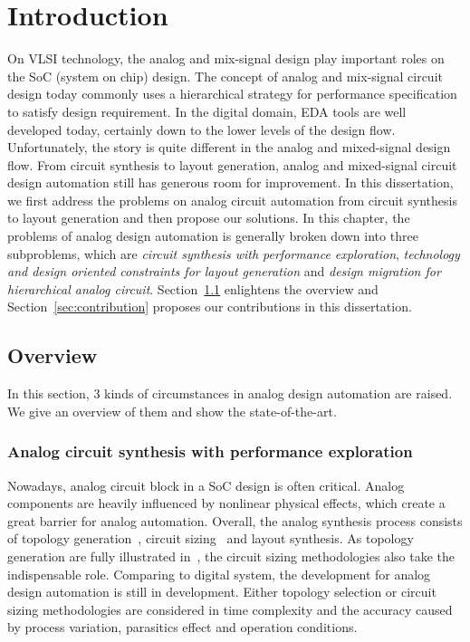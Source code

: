\chapter{Introduction}\label{chap:Intro}

  On VLSI technology, the analog and mix-signal design play important roles on the SoC (system on chip) design. The concept of analog and mix-signal circuit design today commonly uses a hierarchical strategy for performance specification~\cite{CADonAMSIC_GG-ProcIEEE2000} to satisfy design requirement. In the digital domain, EDA tools are well developed today, certainly down to the lower levels of the design flow. Unfortunately, the story is quite different in the analog and mixed-signal design flow. From circuit synthesis to layout generation, analog and mixed-signal circuit design automation still has generous room for improvement. In this dissertation, we first address the problems on analog circuit automation from circuit synthesis to layout generation and then propose our solutions. In this chapter, the problems of analog design automation is generally broken down into three subproblems, which are {\it circuit synthesis with performance exploration}, {\it technology and design oriented constraints for layout generation} and {\it design migration for hierarchical analog circuit}. Section~\ref{sec:overview} enlightens the overview and Section~\ref{sec:contribution} proposes our contributions in this dissertation. 

  \section{Overview}\label{sec:overview}

    In this section, 3 kinds of circumstances in analog design automation are raised. We give an overview of them and show the state-of-the-art. 

    \subsection{Analog circuit synthesis with performance exploration}\label{subsec:PAGEOverview}

      Nowadays, analog circuit block in a SoC design is often critical. Analog components are heavily influenced by nonlinear physical effects, which create a great barrier for analog automation. Overall, the analog synthesis process consists of topology generation~\cite{TopoSel_ICCAD2008,IPTopoSel_TCAD1995,CAFFEINE_DATE2005}, circuit sizing~\cite{MARS_TCAD2012} and layout synthesis. As topology generation are fully illustrated in~\cite{TopoSel_ICCAD2008,IPTopoSel_TCAD1995,CAFFEINE_DATE2005}, the circuit sizing methodologies also take the indispensable role. Comparing to digital system, the development for analog design automation is still in development. Either topology selection or circuit sizing methodologies are considered in time complexity and the accuracy caused by process variation, parasitics effect and operation conditions.

